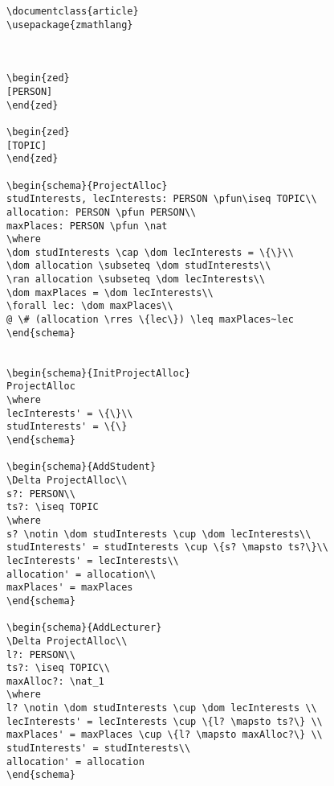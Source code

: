 \begin{verbatim}
\documentclass{article}
\usepackage{zmathlang}



\begin{zed}
[PERSON]
\end{zed}

\begin{zed}
[TOPIC]
\end{zed}

\begin{schema}{ProjectAlloc}
studInterests, lecInterests: PERSON \pfun\iseq TOPIC\\
allocation: PERSON \pfun PERSON\\
maxPlaces: PERSON \pfun \nat
\where
\dom studInterests \cap \dom lecInterests = \{\}\\
\dom allocation \subseteq \dom studInterests\\
\ran allocation \subseteq \dom lecInterests\\
\dom maxPlaces = \dom lecInterests\\
\forall lec: \dom maxPlaces\\
@ \# (allocation \rres \{lec\}) \leq maxPlaces~lec
\end{schema}


\begin{schema}{InitProjectAlloc}
ProjectAlloc
\where
lecInterests' = \{\}\\
studInterests' = \{\}
\end{schema}

\begin{schema}{AddStudent}
\Delta ProjectAlloc\\
s?: PERSON\\
ts?: \iseq TOPIC
\where
s? \notin \dom studInterests \cup \dom lecInterests\\
studInterests' = studInterests \cup \{s? \mapsto ts?\}\\
lecInterests' = lecInterests\\
allocation' = allocation\\
maxPlaces' = maxPlaces
\end{schema}

\begin{schema}{AddLecturer}
\Delta ProjectAlloc\\
l?: PERSON\\
ts?: \iseq TOPIC\\
maxAlloc?: \nat_1
\where
l? \notin \dom studInterests \cup \dom lecInterests \\
lecInterests' = lecInterests \cup \{l? \mapsto ts?\} \\
maxPlaces' = maxPlaces \cup \{l? \mapsto maxAlloc?\} \\
studInterests' = studInterests\\
allocation' = allocation
\end{schema}


\end{verbatim}
